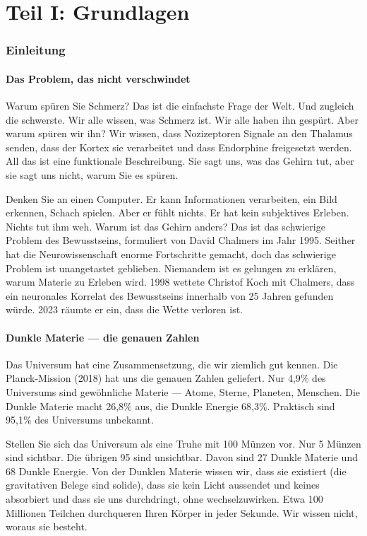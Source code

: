 \documentclass[11pt,a4paper]{article}
\begin{document}
\newpage
\part*{Teil I: Grundlagen}
\section{Einleitung}

\subsection{Das Problem, das nicht verschwindet}
Warum spüren Sie Schmerz? Das ist die einfachste Frage der Welt. Und zugleich die schwerste. Wir alle wissen, was Schmerz ist. Wir alle haben ihn gespürt. Aber warum spüren wir ihn? Wir wissen, dass Nozizeptoren Signale an den Thalamus senden, dass der Kortex sie verarbeitet und dass Endorphine freigesetzt werden. All das ist eine funktionale Beschreibung. Sie sagt uns, was das Gehirn tut, aber sie sagt uns nicht, warum Sie es spüren.

Denken Sie an einen Computer. Er kann Informationen verarbeiten, ein Bild erkennen, Schach spielen. Aber er fühlt nichts. Er hat kein subjektives Erleben. Nichts tut ihm weh. Warum ist das Gehirn anders? Das ist das schwierige Problem des Bewusstseins, formuliert von David Chalmers im Jahr 1995. Seither hat die Neurowissenschaft enorme Fortschritte gemacht, doch das schwierige Problem ist unangetastet geblieben. Niemandem ist es gelungen zu erklären, warum Materie zu Erleben wird. 1998 wettete Christof Koch mit Chalmers, dass ein neuronales Korrelat des Bewusstseins innerhalb von 25 Jahren gefunden würde. 2023 räumte er ein, dass die Wette verloren ist.

\subsection{Dunkle Materie --- die genauen Zahlen}
Das Universum hat eine Zusammensetzung, die wir ziemlich gut kennen. Die Planck-Mission (2018) hat uns die genauen Zahlen geliefert. Nur 4,9\% des Universums sind gewöhnliche Materie --- Atome, Sterne, Planeten, Menschen. Die Dunkle Materie macht 26,8\% aus, die Dunkle Energie 68,3\%. Praktisch sind 95,1\% des Universums unbekannt.

Stellen Sie sich das Universum als eine Truhe mit 100 Münzen vor. Nur 5 Münzen sind sichtbar. Die übrigen 95 sind unsichtbar. Davon sind 27 Dunkle Materie und 68 Dunkle Energie. Von der Dunklen Materie wissen wir, dass sie existiert (die gravitativen Belege sind solide), dass sie kein Licht aussendet und keines absorbiert und dass sie uns durchdringt, ohne wechselzuwirken. Etwa 100 Millionen Teilchen durchqueren Ihren Körper in jeder Sekunde. Wir wissen nicht, woraus sie besteht.
\end{document}
